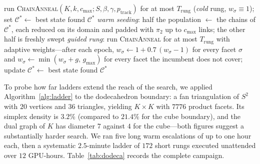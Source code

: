 \documentclass[12pt]{article}
\newcommand{\SC}{\mathrm{SC}}
\newcommand{\SCst}{\SC_{\mathrm{strict}}}
\begin{document}
\begin{algorithm}[H]
\caption{\textsc{WarmLadder}($K$, $k$, $c_{\max}$; $S$, $\beta$,
$\gamma$, $p_{\mathrm{track}}$; per-rung budget $T_{\mathrm{rung}}$,
guided increment $g$, cap $g_{\max}$, max rungs $R_{\max}$).
Algorithm~\ref{alg:anneal} run as a ladder: warm seeding between rungs,
guided reweighting within each rung.}
\label{alg:ladder}
\begin{algorithmic}[1]
\State run \textsc{ChainAnneal}$(K,k,c_{\max};S,\beta,\gamma,
p_{\mathrm{track}})$ for at most $T_{\mathrm{rung}}$ (\emph{cold} rung,
$w_\sigma\equiv1$); set $\mathcal{C}^{*}\gets$ best state found
    \State\Return $\mathcal{C}^{*}$
    \Comment{certificate: $\SCst(K)\le k-1$}
  \EndIf
  \State \emph{warm seeding}: half the population $\gets$ the chains of
  $\mathcal{C}^{*}$, each reduced on its domain and padded with $\pi_2$
  up to $c_{\max}$ links; the other half is freshly swept
  \State \emph{guided rung}: run \textsc{ChainAnneal} for at most
  $T_{\mathrm{rung}}$ with adaptive weights---after each epoch,
  $w_\sigma\gets1+0.7\,(w_\sigma-1)$ for every facet $\sigma$ and
  $w_\sigma\gets\min(w_\sigma+g,\,g_{\max})$ for every facet the
  incumbent does not cover; update $\mathcal{C}^{*}\gets$ best state
  found 
\EndFor
\State\Return $\mathcal{C}^{*}$
\end{algorithmic}
\end{algorithm}

To probe how far ladders extend the reach of the search, we applied
Algorithm~\ref{alg:ladder} to the dodecahedron boundary: a fan
triangulation of $S^2$ with $20$ vertices and $36$ triangles, yielding
$K\times K$ with $7776$ product facets.  Its simplex density is $3.2\%$
(compared to $21.4\%$ for the cube boundary), and the dual graph of $K$
has diameter $7$ against $4$ for the cube---both figures suggest a
substantially harder search.  We ran five long warm escalations of up
to one hour each, then a systematic $2.5$-minute ladder of $172$ short
rungs executed unattended over $12$ GPU-hours.
Table~\ref{tab:dodeca} records the complete campaign.
\end{document}
